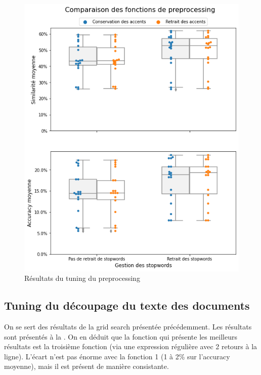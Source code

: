             \begin{figure}[htbp]
                \begin{center}
                \includegraphics[width=0.9\linewidth]{img/tuning_prepro.png}
                \end{center}
                \caption{Résultats du tuning du preprocessing}
                \label{fig:tuning_prepro}
            \end{figure}     

            \subsection{Tuning du découpage du texte des documents}

            On se sert des résultats de la grid search présentée précédemment.
            Les résultats sont présentés à la .
            On en déduit que la fonction qui présente les meilleurs résultats est la troisième fonction (via une expression régulière avec 2 retours à la ligne).
            L'écart n'est pas énorme avec la fonction 1 (1 à 2\% sur l'accuracy moyenne), mais il est présent de manière consistante.

